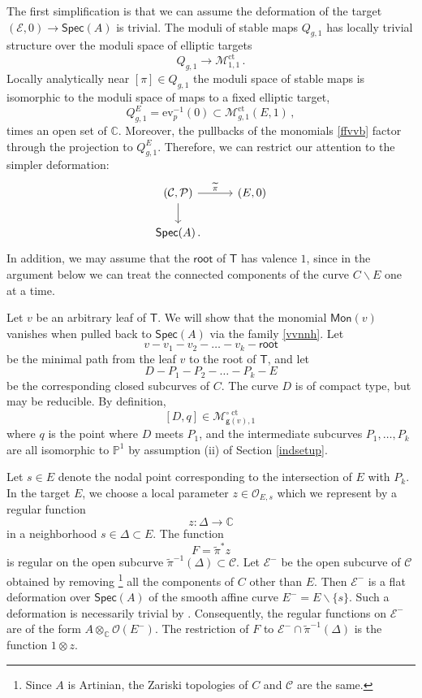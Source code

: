 \documentclass[11pt]{amsart}
\theoremstyle{definition}
\newcommand{\M}{\mathcal{M}}
\DeclareMathOperator{\ct}{ct}
\renewcommand{\tilde}{\widetilde}
\begin{document}
{The first simplification is that 
we can assume the deformation of the target $(\mathcal{E},0) \rightarrow  \mathsf{Spec}(A)$ is trivial.
The moduli of stable maps $Q_{g,1}$ has locally trivial structure over the moduli space
of elliptic targets
$$Q_{g,1} \rightarrow \M^{\ct}_{1,1}\, .$$
Locally analytically near  $[\pi] \in Q_{g,1}$ the moduli space
of stable maps is isomorphic to the moduli space of maps to a fixed elliptic target,
$$Q^E_{g,1} = \mathrm{ev}^{-1}_p(0) \subset \M^{\ct}_{g,1}(E,1)\, ,$$
times an open set of $\mathbb{C}$. Moreover, the pullbacks of the monomials 
\eqref{ffvvb}
factor through the
projection to $Q^E_{g,1}$. Therefore,
we can restrict our attention to
the simpler deformation:
\begin{equation}
\label{vvnnh}
\begin{tikzcd}
(\mathcal {C},\mathcal{P}) \arrow[d] \arrow[r, "\widetilde{\pi}"] & (E,0)  \\
\mathsf{Spec}(A)\,.         &  \,                        
\end{tikzcd}
\end{equation}
In addition, we may assume that the $\mathsf{root}$ of $\mathsf T$ has valence $1$, since in the argument below we can treat the connected components of the curve $C\smallsetminus E$ one at a time. 

Let $v$ be an arbitrary leaf of $\mathsf{T}$. We will show that the monomial $\mathsf{Mon}(v)$ 
vanishes when pulled back to $\mathsf{Spec}(A)$ via the family \eqref{vvnnh}.
Let 
\begin{equation} \label{vll4} v - v_1 - v_2 - \ldots - v_k - \mathsf{root}\end{equation}
be the minimal path from the leaf $v$ to the root of $\mathsf{T}$, and let
$$D-P_1 - P_2 - \ldots - P_k - E $$
be the corresponding closed subcurves of $C$.
The curve $D$ is of compact type, but may be reducible. By definition, 
$$[D,q] \in \M_{\mathsf{g}(v),1}^{\circ \ct}\, $$
where $q$ is the point where $D$ meets $P_1$, and 
the intermediate subcurves $P_1,\ldots, P_k$
are all isomorphic to $\mathbb{P}^1$ by assumption (ii) of Section \ref{indsetup}. 

Let $s\in E$ denote the nodal point corresponding to the intersection of $E$ with $P_k$. In the target $E$, we choose a local parameter $z\in \mathcal O_{E,s}$ which we represent by a regular function  
$$z:\Delta\to \mathbb C$$ in a neighborhood $s\in \Delta\subset E$. The function $$F=\tilde \pi^{*} z$$ is regular on the open subcurve $\tilde \pi^{-1}(\Delta)\subset \mathcal C$. Let $\mathcal E^-$ be the open subcurve of $\mathcal C$ obtained by removing {\footnote{Since
$A$ is Artinian, the Zariski topologies of $C$ and $\mathcal {C}$
are the same.}} all the components of $C$ other than $E$. Then $\mathcal E^-$ is a flat deformation over $\mathsf{Spec }(A)$ of the smooth affine curve $E^-= E\smallsetminus \{s\}$. Such a deformation is necessarily trivial by \cite[Theorem 1.2.4]{Ser}. 
Consequently, the regular functions on $\mathcal E^-$ are of the form $A\otimes_{\mathbb C} \mathcal O(E^{-})$. The restriction of $F$ to $\mathcal E^-\cap \tilde \pi^{-1}(\Delta)$ is the function $1\otimes z$. 

}
\end{document}
